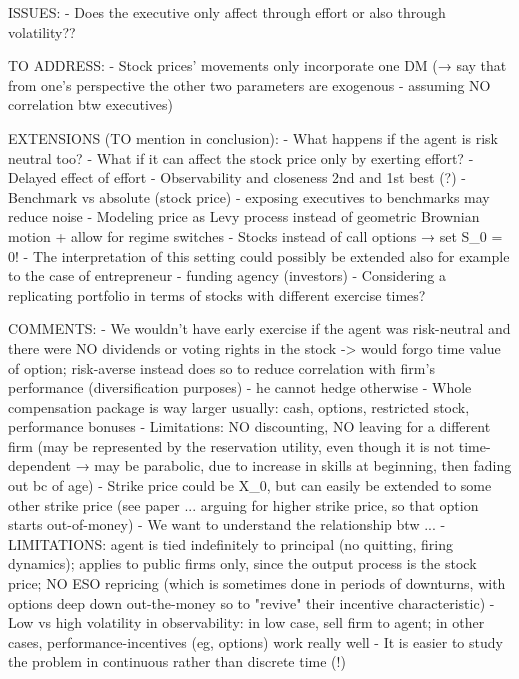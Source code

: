 ISSUES:
- Does the executive only affect through effort or also through volatility??



TO ADDRESS:
- Stock prices' movements only incorporate one DM (→ say that from one's perspective the other two parameters are exogenous - assuming NO correlation btw executives) 


EXTENSIONS (TO mention in conclusion):
- What happens if the agent is risk neutral too?
- What if it can affect the stock price only by exerting effort?
- Delayed effect of effort
- Observability and closeness 2nd and 1st best (?)
- Benchmark vs absolute (stock price) - exposing executives to benchmarks may reduce noise
- Modeling price as Levy process instead of geometric Brownian motion + allow for regime switches
- Stocks instead of call options → set S_0 = 0!
- The interpretation of this setting could possibly be extended also for example to the case of entrepreneur - funding agency (investors)
- Considering a replicating portfolio in terms of stocks with different exercise times?


COMMENTS:
- We wouldn't have early exercise if the agent was risk-neutral and there were NO dividends or voting rights in the stock -> would forgo time value of option; risk-averse instead does so to reduce correlation with firm's performance (diversification purposes) - he cannot hedge otherwise
- Whole compensation package is way larger usually: cash, options, restricted stock, performance bonuses
- Limitations: NO discounting, NO leaving for a different firm (may be represented by the reservation utility, even though it is not time-dependent → may be parabolic, due to increase in skills at beginning, then fading out bc of age)
- Strike price could be X_0, but can easily be extended to some other strike price (see paper ... arguing for higher strike price, so that option starts out-of-money)
- We want to understand the relationship btw ...
- LIMITATIONS: agent is tied indefinitely to principal (no quitting, firing dynamics); applies to public firms only, since the output process is the stock price; NO ESO repricing (which is sometimes done in periods of downturns, with options deep down out-the-money so to "revive" their incentive characteristic)
- Low vs high volatility in observability: in low case, sell firm to agent; in other cases, performance-incentives (eg, options) work really well
- It is easier to study the problem in continuous rather than discrete time (!)
